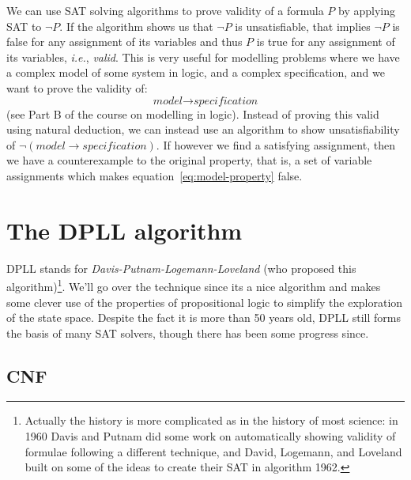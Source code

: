 \documentclass{article}
\theoremstyle{definition}
\newcommand{\ie}{\emph{i.e.}}
\begin{document}
We can use SAT solving algorithms to prove validity of a formula $P$
by applying SAT to $\neg P$. If the algorithm shows us that $\neg P$
is unsatisfiable, that implies $\neg P$ is false for any assignment of
its variables and thus $P$ is true for any assignment of its
variables, \ie{}, \emph{valid}. This is very useful for modelling
problems where we have a complex model of some system in logic, and a
complex specification, and we want to prove the validity of:
\begin{equation}
\textit{model} \rightarrow \textit{specification}
\label{eq:model-property}
\end{equation}
(see Part B of the course on modelling in logic). Instead of proving
this valid using natural deduction, we can instead use an algorithm
to show unsatisfiability of
$\neg (\textit{model} \rightarrow \textit{specification})$. If however
we find a satisfying assignment, then we have a counterexample to the
original property, that is, a set of variable assignments which makes
equation~\eqref{eq:model-property} false.

\section{The DPLL algorithm}

DPLL stands for \emph{Davis-Putnam-Logemann-Loveland} (who proposed
this algorithm)\footnote{Actually the history is more complicated as
  in the history of most science: in 1960 Davis and Putnam did some
  work on automatically showing validity of formulae following a
  different technique, and David, Logemann, and Loveland built on some
  of the ideas to create their SAT in algorithm 1962.}. We'll go over
the technique since its a nice algorithm and makes some clever use of
the properties of propositional logic to simplify the exploration of
the state space. Despite the fact it is more than 50 years old, DPLL
still forms the basis of many SAT solvers, though there has been
some progress since.

\subsection{CNF}
\end{document}

